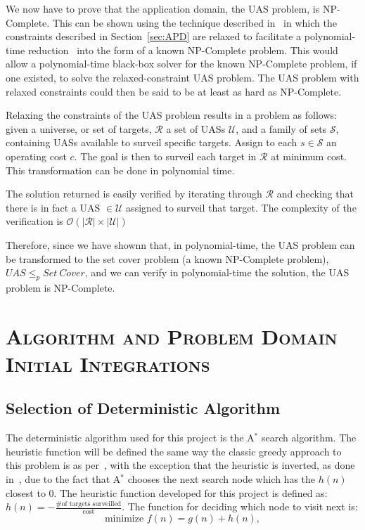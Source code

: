 \documentclass[conference]{IEEEtran}
\newcommand{\heuristic}{${h(n) = -\frac{\text{\# of targets
surveilled}}{\text{cost}}}$}
\newcommand{\bigoh}[1]{\ensuremath{\mathcal{O}(#1)}}		%
\begin{document}
We now have to prove that the application domain, the UAS problem, is
NP-Complete. This can be shown using the technique described
in~\cite{586textbook} in which the constraints described in
Section~\ref{sec:APD} are relaxed to facilitate a polynomial-time
reduction~\cite{wiki:polyReduction} into the form of a known NP-Complete
problem. This would allow a polynomial-time black-box solver for the known
NP-Complete problem, if one existed, to solve the relaxed-constraint UAS
problem. The UAS problem with relaxed constraints could then be said to be at
least as hard as NP-Complete.

Relaxing the constraints of the UAS problem results in a problem as follows:
given a universe, or set of targets, $\mathcal{R}$ a set of UASs $\mathcal{U}$,
and a family of sets $\mathcal{S}$, containing UASs available to surveil
specific targets. Assign to each $s \in \mathcal{S}$ an operating cost $c$. The
goal is then to surveil each target in $\mathcal{R}$ at minimum cost. This
transformation can be done in polynomial time.

The solution returned is easily verified by iterating through $\mathcal{R}$ and
checking that there is in fact a UAS $\in \mathcal{U}$ assigned to surveil that
target. The complexity of the verification is ${\bigoh{|\mathcal{R}| \times
|\mathcal{U}|}}$

Therefore, since we have shownn that, in polynomial-time, the UAS problem can
be transformed to the set cover problem (a known NP-Complete problem),
${\mathit{UAS} \leq_p \mathit{Set\ Cover}}$, and we can verify in
polynomial-time the solution, the UAS problem is NP-Complete.


\section{\textsc{Algorithm and Problem Domain Initial Integrations}} \label{sec:initIntegration}

\subsection{Selection of Deterministic Algorithm} \label{sec:detAlg}

The deterministic algorithm used for this project is the A$^*$ search
algorithm. The heuristic function will be defined the same way the classic
greedy approach to this problem is as per~\cite{wiki:SCP}, with the exception
that the heuristic is inverted, as done in~\cite{pjcvphw8}, due to the fact
that A$^*$ chooses the next search node which has the $h(n)$ closest to $0$.
The heuristic function developed for this project is defined as: \heuristic.
The function for deciding which node to visit next is: \[ \text{minimize } f(n)
= g(n) + h(n), \]
\end{document}
